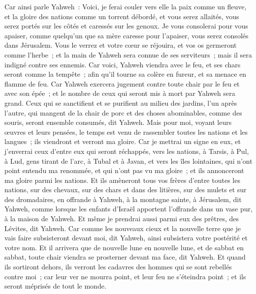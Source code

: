 \begin{multicols}{2}
Car ainsi parle Yahweh~: Voici, je ferai couler vers elle la paix comme un fleuve, et la gloire des nations comme un torrent débordé, et vous serez allaités, vous serez portés sur les côtés et caressés sur les genoux.
Je vous consolerai pour vous apaiser, comme quelqu'un que sa mère caresse pour l'apaiser, vous serez consolés dans Jérusalem.
Vous le verrez et votre cœur se réjouira, et vos os germeront comme l'herbe~; et la main de Yahweh sera connue de ses serviteurs~; mais il sera indigné contre ses ennemis.
Car voici, Yahweh viendra avec le feu, et ses chars seront comme la tempête~; afin qu'il tourne sa colère en fureur, et sa menace en flamme de feu.
Car Yahweh exercera jugement contre toute chair par le feu et avec son épée~; et le nombre de ceux qui seront mis à mort par Yahweh sera grand.
Ceux qui se sanctifient et se purifient au milieu des jardins, l'un après l'autre, qui mangent de la chair de porc et des choses abominables, comme des souris, seront ensemble consumés, dit Yahweh.
Mais pour moi, voyant leurs œuvres et leurs pensées, le temps est venu de rassembler toutes les nations et les langues~; ils viendront et verront ma gloire.
Car je mettrai un signe en eux, et j'enverrai ceux d'entre eux qui seront réchappés, vers les nations, à Tarsis, à Pul, à Lud, gens tirant de l'arc, à Tubal et à Javan, et vers les îles lointaines, qui n'ont point entendu ma renommée, et qui n'ont pas vu ma gloire~; et ils annonceront ma gloire parmi les nations.
Et ils amèneront tous vos frères d'entre toutes les nations, sur des chevaux, sur des chars et dans des litières, sur des mulets et sur des dromadaires, en offrande à Yahweh, à la montagne sainte, à Jérusalem, dit Yahweh, comme lorsque les enfants d'Israël apportent l'offrande dans un vase pur, à la maison de Yahweh.
Et même je prendrai aussi parmi eux des prêtres, des Lévites, dit Yahweh.
Car comme les nouveaux cieux et la nouvelle terre que je vais faire subsisteront devant moi, dit Yahweh, ainsi subsistera votre postérité et votre nom.
Et il arrivera que de nouvelle lune en nouvelle lune, et de sabbat en sabbat, toute chair viendra se prosterner devant ma face, dit Yahweh.
Et quand ils sortiront dehors, ils verront les cadavres des hommes qui se sont rebellés contre moi~; car leur ver ne mourra point, et leur feu ne s'éteindra point~; et ils seront méprisés de tout le monde.
\PPE{}
\end{multicols}
